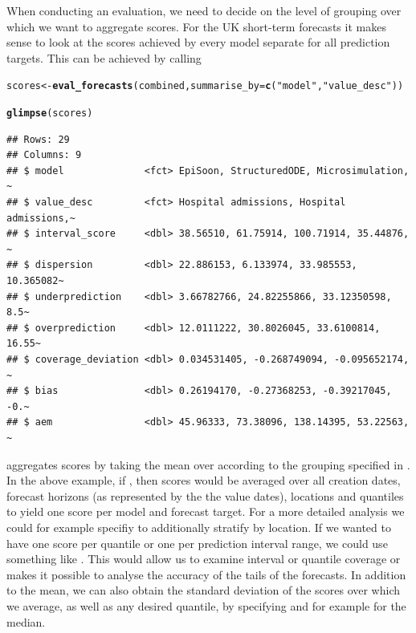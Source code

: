 \documentclass[article,shortnames]{jss}\usepackage[]{graphicx}\usepackage[]{color}
\makeatletter
\newcommand{\hlstr}[1]{\textcolor[rgb]{0.192,0.494,0.8}{#1}}%
\newcommand{\hlstd}[1]{\textcolor[rgb]{0.345,0.345,0.345}{#1}}%
\newcommand{\hlkwb}[1]{\textcolor[rgb]{0.69,0.353,0.396}{#1}}%
\newcommand{\hlkwc}[1]{\textcolor[rgb]{0.333,0.667,0.333}{#1}}%
\newcommand{\hlkwd}[1]{\textcolor[rgb]{0.737,0.353,0.396}{\textbf{#1}}}%
\newenvironment{kframe}{%
 \def\at@end@of@kframe{}%
 \ifinner\ifhmode%
  \def\at@end@of@kframe{\end{minipage}}%
  \begin{minipage}{\columnwidth}%
 \fi\fi%
 \def\FrameCommand##1{\hskip\@totalleftmargin \hskip-\fboxsep
 \colorbox{shadecolor}{##1}\hskip-\fboxsep
     \hskip-\linewidth \hskip-\@totalleftmargin \hskip\columnwidth}%
 \MakeFramed {\advance\hsize-\width
   \@totalleftmargin\z@ \linewidth\hsize
   \@setminipage}}%
 {\par\unskip\endMakeFramed%
 \at@end@of@kframe}
\newenvironment{knitrout}{}{} %
\newcommand{\fct}[1]{\code{#1()}}
\makeatother
\begin{document}
When conducting an evaluation, we need to decide on the level of grouping over which we want to aggregate scores. For the UK short-term forecasts it makes sense to look at the scores achieved by every model separate for all prediction targets. This can be achieved by calling
\begin{knitrout}
\color{fgcolor}\begin{kframe}
\begin{alltt}
\hlstd{scores} \hlkwb{<-} \hlkwd{eval_forecasts}\hlstd{(combined,} \hlkwc{summarise_by} \hlstd{=} \hlkwd{c}\hlstd{(}\hlstr{"model"}\hlstd{,} \hlstr{"value_desc"}\hlstd{))}

\hlkwd{glimpse}\hlstd{(scores)}
\end{alltt}
\begin{verbatim}
## Rows: 29
## Columns: 9
## $ model              <fct> EpiSoon, StructuredODE, Microsimulation, ~
## $ value_desc         <fct> Hospital admissions, Hospital admissions,~
## $ interval_score     <dbl> 38.56510, 61.75914, 100.71914, 35.44876, ~
## $ dispersion         <dbl> 22.886153, 6.133974, 33.985553, 10.365082~
## $ underprediction    <dbl> 3.66782766, 24.82255866, 33.12350598, 8.5~
## $ overprediction     <dbl> 12.0111222, 30.8026045, 33.6100814, 16.55~
## $ coverage_deviation <dbl> 0.034531405, -0.268749094, -0.095652174, ~
## $ bias               <dbl> 0.26194170, -0.27368253, -0.39217045, -0.~
## $ aem                <dbl> 45.96333, 73.38096, 138.14395, 53.22563, ~
\end{verbatim}
\end{kframe}
\end{knitrout}
% 
\fct{eval\_forecasts} aggregates scores by taking the mean over according to the grouping specified in . In the above example, if , then scores would be averaged over all creation dates, forecast horizons (as represented by the the value dates), locations and quantiles to yield one score per model and forecast target. For a more detailed analysis we could for example specifiy  to additionally stratify by location. If we wanted to have one score per quantile or one per prediction interval range, we could use something like . This would allow us to examine interval or quantile coverage or makes it possible to analyse the accuracy of the tails of the forecasts. In addition to the mean, we can also obtain the standard deviation of the scores over which we average, as well as any desired quantile, by specifying  and for example  for the median. 
\end{document}
